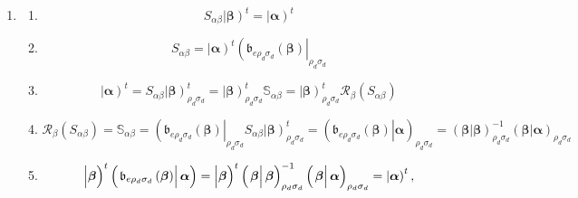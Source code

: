 \documentclass[aps,preprint]{revtex4}
\begin{document}
\begin{enumerate}
\item 
\begin{enumerate}
\item 
\begin{equation}
S_{\alpha \beta }\left\vert \boldsymbol{\beta }\right) ^{t}=\left\vert 
\boldsymbol{\alpha }\right) ^{t}
\end{equation}

\item 
\begin{equation}
S_{\alpha \beta }=\left\vert \boldsymbol{\alpha }\right) ^{t}\left( 
\mathfrak{b}_{e\rho _{d}\sigma _{d}}\left( \boldsymbol{\beta }\right)
\right\vert _{\rho _{d}\sigma _{d}}
\end{equation}

\item 
\begin{equation*}
\left\vert \boldsymbol{\alpha }\right) ^{t}=S_{\alpha \beta }\left\vert 
\boldsymbol{\beta }\right) _{\rho _{d}\sigma _{d}}^{t}=\left\vert 
\boldsymbol{\beta }\right) _{\rho _{d}\sigma _{d}}^{t}\mathbb{S}_{\alpha
\beta }=\left\vert \boldsymbol{\beta }\right) _{\rho _{d}\sigma _{d}}^{t}%
\mathcal{R}_{\beta }\left( S_{\alpha \beta }\right)
\end{equation*}

\item 
\begin{equation}
\mathcal{R}_{\beta }\left( S_{\alpha \beta }\right) =\mathbb{S}_{\alpha
\beta }=\left( \mathfrak{b}_{e\rho _{d}\sigma _{d}}\left( \boldsymbol{\beta }%
\right) \right\vert _{\rho _{d}\sigma _{d}}S_{\alpha \beta }\left\vert 
\boldsymbol{\beta }\right) _{\rho _{d}\sigma _{d}}^{t}=\left( \left. 
\mathfrak{b}_{e\rho _{d}\sigma _{d}}\left( \boldsymbol{\beta }\right)
\right\vert \boldsymbol{\alpha }\right) _{\rho _{d}\sigma _{d}}=\left(
\left. \boldsymbol{\beta }\right\vert \boldsymbol{\beta }\right) _{\rho
_{d}\sigma _{d}}^{-1}\left( \left. \boldsymbol{\beta }\right\vert 
\boldsymbol{\alpha }\right) _{\rho _{d}\sigma _{d}}
\end{equation}

\item 
\begin{equation*}
\left\vert \overset{}{\boldsymbol{\beta }}\right) ^{t}\left( \left. \overset{%
}{\mathfrak{b}_{e\rho _{d}\sigma _{d}}\left( \boldsymbol{\beta }\right) }%
\right\vert \boldsymbol{\alpha }\right) =\left\vert \overset{}{\boldsymbol{%
\beta }}\right) ^{t}\left( \left. \overset{}{\boldsymbol{\beta }}\right\vert 
\boldsymbol{\beta }\right) _{\rho _{d}\sigma _{d}}^{-1}\left( \left. \overset%
{}{\boldsymbol{\beta }}\right\vert \boldsymbol{\alpha }\right) _{\rho
_{d}\sigma _{d}}=\left\vert \overset{}{\boldsymbol{\alpha }}\right) ^{t},
\end{equation*}


\end{enumerate}
\end{enumerate}
\end{document}
